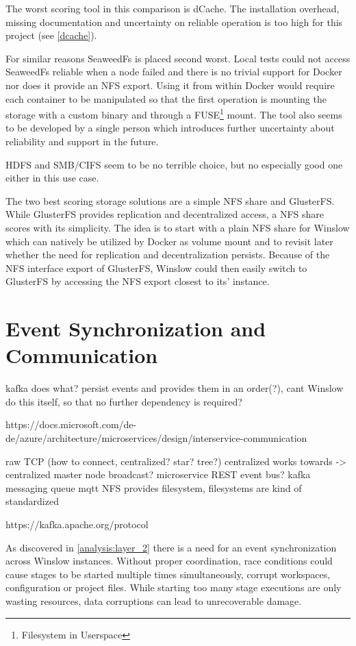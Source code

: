 The worst scoring tool in this comparison is dCache.
The installation overhead, missing documentation and uncertainty on reliable operation is too high for this project (see \autoref{dcache}).

For similar reasons SeaweedFs is placed second worst.
Local tests could not access SeaweedFs reliable when a node failed and there is no trivial support for Docker nor does it provide an NFS export.
Using it from within Docker would require each container to be manipulated so that the first operation is mounting the storage with a custom binary and through a FUSE\footnote{Filesystem in Userspace} mount.
The tool also seems to be developed by a single person which introduces further uncertainty about reliability and support in the future.

HDFS and SMB/CIFS seem to be no terrible choice, but no especially good one either in this use case.

The two best scoring storage solutions are a simple NFS share and GlusterFS.
While GlusterFS provides replication and decentralized access, a NFS share scores with its simplicity.
The idea is to start with a plain NFS share for Winslow which can natively be utilized by Docker as volume mount and to revisit later whether the need for replication and decentralization persists.
Because of the NFS interface export of GlusterFS, Winslow could then easily switch to GlusterFS by accessing the NFS export closest to its' instance.

\section{Event Synchronization and Communication}


kafka does what? persist events and provides them in an order(?), cant Winslow do this itself, so that no further dependency is required?

https://docs.microsoft.com/de-de/azure/architecture/microservices/design/interservice-communication


raw TCP (how to connect, centralized? star? tree?) centralized works towards -> centralized master node
broadcast?
microservice REST
event bus? kafka
messaging queue mqtt
NFS provides filesystem, filesystems are kind of standardized

https://kafka.apache.org/protocol


As discovered in \autoref{analysis:layer_2} there is a need for an event synchronization across Winslow instances.
Without proper coordination, race conditions could cause stages to be started multiple times simultaneously, corrupt workspaces, configuration or project files.
While starting too many stage executions are only wasting resources, data corruptions can lead to unrecoverable damage.

